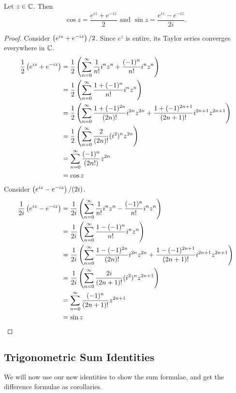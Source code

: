 \documentclass[notitlepage]{problem-solving}
\begin{document}
\begin{proposition}
	Let $z\in\mathbb{C}$.
	Then
	\[
		\cos z = \frac{ e^{iz} + e^{-iz} }{2} \text{ and } \sin z = \frac{ e^{iz} - e^{-iz} }{2i}.
	\]
\end{proposition}
\begin{proof}
	Consider $\left( e^{iz}+e^{-iz} \right)/2$.
	Since $e^z$ is entire, its Taylor series converges everywhere in $\mathbb{C}$.
	\begin{align*}
		\frac{1}{2}\left( e^{iz}+e^{-iz} \right)
		&= \frac{1}{2}\left( \sum_{n=0}^\infty \frac{1}{n!} i^n z^n + \frac{(-1)^n}{n!} i^n z^n \right)\\
		&= \frac{1}{2}\left( \sum_{n=0}^\infty \frac{1+(-1)^n}{n!} i^n z^n \right)\\
		&= \frac{1}{2}\left( \sum_{n=0}^\infty \frac{1+(-1)^{2n}}{(2n)!}i^{2n}z^{2n} + \frac{1+(-1)^{2n+1}}{(2n+1)!}i^{2n+1}z^{2n+1} \right)\\
		&= \frac{1}{2}\left( \sum_{n=0}^\infty \frac{2}{(2n)!}(i^2)^nz^{2n} \right)\\
		&= \sum_{n=0}^\infty \frac{(-1)^n}{(2n!)} z^{2n}\\
		&= \cos z
	\end{align*}
	Consider $\left( e^{iz}-e^{-iz} \right)/(2i)$.
	\begin{align*}
		\frac{1}{2i}\left( e^{iz}-e^{-iz} \right)
		&= \frac{1}{2i}\left( \sum_{n=0}^\infty \frac{1}{n!} i^n z^n - \frac{(-1)^n}{n!} i^n z^n \right)\\
		&= \frac{1}{2i}\left( \sum_{n=0}^\infty \frac{1-(-1)^n}{n!} i^n z^n \right)\\
		&= \frac{1}{2i}\left( \sum_{n=0}^\infty \frac{1-(-1)^{2n}}{(2n)!}i^{2n}z^{2n} + \frac{1-(-1)^{2n+1}}{(2n+1)!}i^{2n+1}z^{2n+1} \right)\\
		&= \frac{1}{2i}\left( \sum_{n=0}^\infty \frac{2i}{(2n+1)!}(i^2)^nz^{2n+1} \right)\\
		&= \sum_{n=0}^\infty \frac{(-1)^n}{(2n+1)!} z^{2n+1}\\
		&= \sin z
	\end{align*}
\end{proof}

\subsection{Trigonometric Sum Identities}

We will now use our new identities to show the sum formulae, and get the difference formulae as corollaries.
\end{document}
